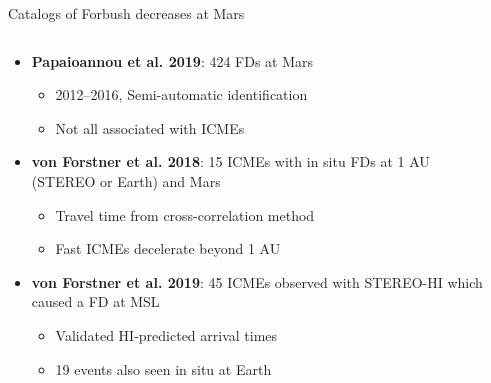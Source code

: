\documentclass[10pt,aspectratio=169,usenames,dvipsnames]{beamer}
\begin{document}
\begin{frame}{Catalogs of Forbush decreases at Mars}
    \begin{columns}
    	\begin{column}{0.55\textwidth}
    		\begin{itemize}
                \item<1-> \textbf{Papaioannou et al. 2019}: 424 FDs at Mars
                    \begin{itemize}
                        \item 2012--2016, Semi-automatic identification
                        \item Not all associated with ICMEs
                    \end{itemize}
                \item<2-> \textbf{von Forstner et al. 2018}: 15 ICMEs with in situ FDs at 1 AU (STEREO or Earth) and Mars
                    \begin{itemize}
                        \item Travel time from cross-correlation method
                        \item Fast ICMEs decelerate beyond 1 AU
                    \end{itemize}
    			\item<3-> \textbf{von Forstner et al. 2019}: 45 ICMEs observed with STEREO-HI which caused a FD at MSL
    				\begin{itemize}
                        \item Validated HI-predicted arrival times
                        \item 19 events also seen in situ at Earth
    				\end{itemize}
    		\end{itemize}
    	\end{column}
    	\begin{column}{0.35\textwidth}
            \centering
\end{column}
\end{columns}
\end{frame}
\end{document}
